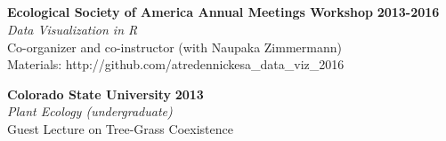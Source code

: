 \documentclass[margin,line]{resume}
\begin{document}
\begin{resume}
    
    
     \section{\textmd{\textsf{\color{MidnightBlue}{Teaching\\Experience}}}}
    \textbf{Ecological Society of America Annual Meetings Workshop} \hfill \textbf{2013-2016}\\
    		\textsl{Data Visualization in R}\\
		Co-organizer and co-instructor (with Naupaka Zimmermann)\\
		Materials: http://github.com/atredennickesa\_data\_viz\_2016
		

    
    \textbf{Colorado State University} \hfill \textbf{2013}\\
               \textsl{Plant Ecology (undergraduate)}\\
               Guest Lecture on Tree-Grass Coexistence
               

\end{resume}
\end{document}

